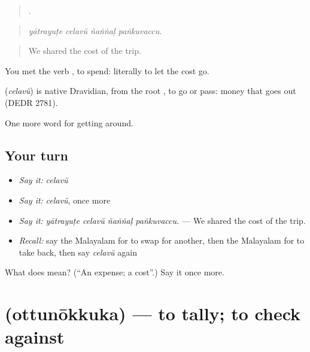 \begin{quote}
   .
\end{quote}

\begin{quote}
\emph{yātrayuṭe celavŭ ñaṅṅaḷ paṅkuvaccu.}
\end{quote}

\begin{quote}
We shared the cost of the trip.
\end{quote}

You met the verb , to spend: literally to let the cost go.

\begin{cousinweb}
\textbf{} (\emph{celavŭ}) is native Dravidian, from the root , to go or pass: money that goes out (DEDR 2781).
\end{cousinweb}

\begin{grammarlens}[title={What you've built}]
One more word for getting around.
\end{grammarlens}

\subsection*{Your turn}
\begin{itemize}
\raggedright
  \item \emph{Say it:} \emph{celavŭ}
  \item \emph{Say it:} \emph{celavŭ}, once more
  \item \emph{Say it:} \emph{yātrayuṭe celavŭ ñaṅṅaḷ paṅkuvaccu.} — We shared the cost of the trip.
  \item \emph{Recall:} say the Malayalam for to swap for another, then the Malayalam for to take back, then say \emph{celavŭ} again
\end{itemize}

\begin{tcolorbox}[breakable,colback=teal!4,colframe=teal!35!black,title={Before you move on}]
What does  mean? (\textquotedblleft{}An expense; a cost\textquotedblright{}.) Say it once more.
\end{tcolorbox}
\section[\texorpdfstring{\ml{ഒത്തുനോക്കുക} (ottunōkkuka)}{ഒത്തുനോക്കുക (ottunōkkuka)}]{ (ottunōkkuka) — to tally; to check against}

